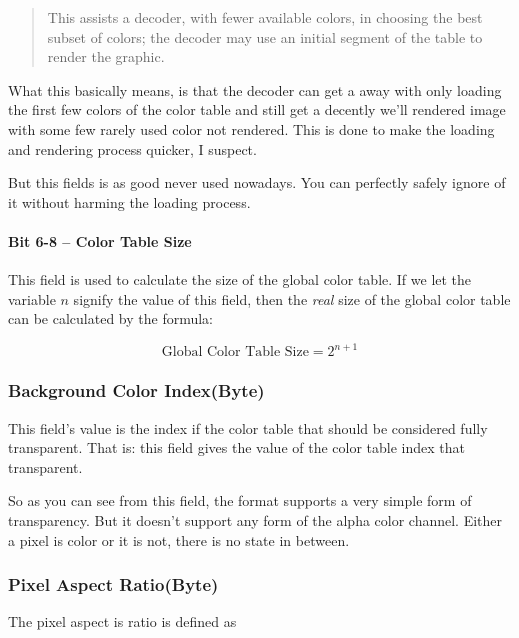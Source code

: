 \begin{refsection}
  \begin{quote}
    This assists a decoder, with fewer available colors, in choosing
    the best subset of colors; the decoder may use an initial segment
    of the table to render the graphic.
  \end{quote}

  What this basically means, is that the decoder can get a away with
  only loading the first few colors of the color table and still get a
  decently we'll rendered image with some few rarely used color not
  rendered. This is done to make the loading and rendering process
  quicker, I suspect.

  But this fields is as good never used nowadays. You can perfectly
  safely ignore of it without harming the loading process.

  \paragraph{Bit 6-8 -- Color Table Size}

  This field is used to calculate the size of the global color
  table. If we let the variable $n$ signify the value of this field,
  then the \textit{real} size of the global color table can be
  calculated by the formula:

  \begin{equation}
    \label{eq:calc-global-color-table-size}
    \textrm{Global Color Table Size} = 2^{n + 1}
  \end{equation}

  \subsubsection{Background Color Index(Byte)}

  This field's value is the index if the color table that should be
  considered fully transparent. That is: this field gives the value of
  the color table index that transparent.

  So as you can see from this field, the \gif format supports a very
  simple form of transparency. But it doesn't support any form of the
  alpha color channel. Either a pixel is color or it is not, there is
  no state in between.

  \subsubsection{Pixel Aspect Ratio(Byte)}

  The pixel aspect is ratio is defined as


\end{refsection}
